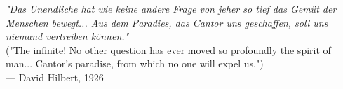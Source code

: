 
\begin{flushright}
\emph{"Das Unendliche hat wie keine andere Frage von jeher so tief das Gemüt der Menschen bewegt... Aus dem Paradies, das Cantor uns geschaffen, soll uns niemand vertreiben können."} \\
("The infinite! No other question has ever moved so profoundly the spirit of man... Cantor's paradise, from which no one will expel us.") \\
— David Hilbert, 1926
\end{flushright}
